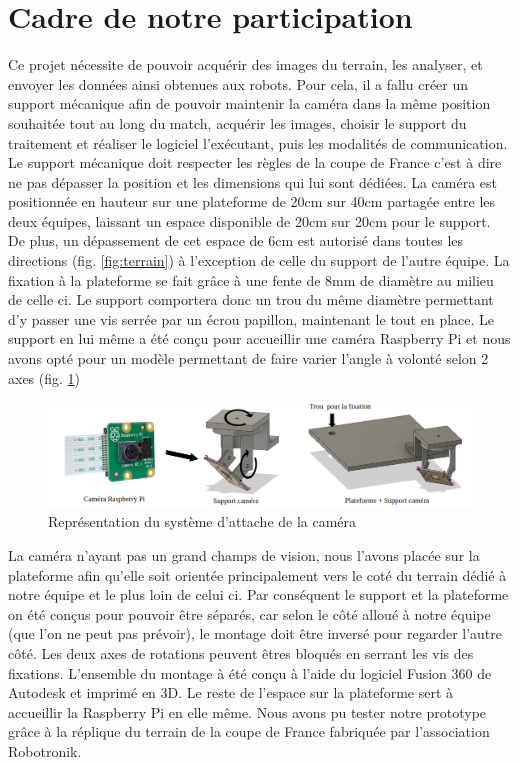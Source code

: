 \documentclass{article}
\begin{document}
\section{Cadre de notre participation}

Ce projet nécessite de pouvoir acquérir des images du terrain, les analyser, et envoyer les données ainsi obtenues aux robots. Pour cela, il a fallu créer un support mécanique afin de pouvoir maintenir la caméra dans la même position souhaitée tout au long du match, acquérir les images, choisir le support du traitement et réaliser le logiciel l’exécutant, puis les modalités de communication.
\newline\newline
Le support mécanique doit respecter les règles de la coupe de France c'est à dire ne pas dépasser la position et les dimensions qui lui sont dédiées.
\newline\newline
La caméra est positionnée en hauteur sur une plateforme de 20cm sur 40cm partagée entre les deux équipes, laissant un espace disponible de 20cm sur 20cm pour le support. De plus, un dépassement de cet espace de 6cm est autorisé dans toutes les directions (fig. \ref{fig:terrain}) à l'exception de celle du support de l'autre équipe. La fixation à la plateforme se fait grâce à une fente de 8mm de diamètre au milieu de celle ci. Le support comportera donc un trou du même diamètre permettant d'y passer une vis serrée par un écrou papillon, maintenant le tout en place.
\newline\newline
Le support en lui même a été conçu pour accueillir une caméra Raspberry Pi et nous avons opté pour un modèle permettant de faire varier l'angle à volonté selon 2 axes (fig. \ref{fig:camera})

\begin{figure}[ht]
    \centering
    \includegraphics[scale = 0.3]{camera}
    \caption{Représentation du système d'attache de la caméra}
    \label{fig:camera}
\end{figure}

La caméra n'ayant pas un grand champs de vision, nous l'avons placée sur la plateforme afin qu'elle soit orientée principalement vers le coté du terrain dédié à notre équipe et le plus loin de celui ci. Par conséquent le support et la plateforme on été conçus pour pouvoir être séparés, car selon le côté alloué à notre équipe (que l'on ne peut pas prévoir), le montage doit être inversé pour regarder l'autre côté. Les deux axes de rotations peuvent êtres bloqués en serrant les vis des fixations. L'ensemble du montage à été conçu à l'aide du logiciel Fusion 360 de Autodesk et imprimé en 3D. Le reste de l'espace sur la plateforme sert à accueillir la Raspberry Pi en elle même. Nous avons pu tester notre prototype grâce à la réplique du terrain de la coupe de France fabriquée par l'association Robotronik.
\end{document}
